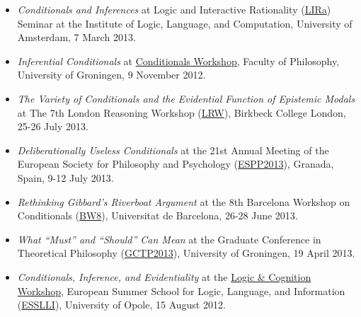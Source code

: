 \documentclass[a4paper,12pt]{article}
\begin{document}
\begin{small}
  \begin{itemize}
  \item \emph{Conditionals and Inferences} at Logic and Interactive
    Rationality (\href{http://www.illc.uva.nl/lgc/seminar/}{LIRa})
    Seminar at the Institute of Logic, Language, and Computation,
    University of Amsterdam, 7 March 2013.
  \item \emph{Inferential Conditionals} at
    \href{https://sites.google.com/site/jannekehuitink/workshop}{Conditionals
      Workshop}, Faculty of Philosophy, University of Groningen, 9
    November 2012.
  \end{itemize}
  
  \begin{itemize}

  \item \emph{The Variety of Conditionals and the Evidential Function
      of Epistemic Modals} at The 7th London Reasoning Workshop (\href{http://www.bbk.ac.uk/psychology/about-us/events/the-7th-london-reasoning-workshop}{LRW}), Birkbeck
    College London, 25-26 July 2013.

  \item \emph{Deliberationally Useless Conditionals} at the 21st
    Annual Meeting of the European Society for Philosophy and
    Psychology (\href{http://espp2013.com}{ESPP2013}), Granada, Spain,
    9-12 July 2013.

  \item \emph{Rethinking Gibbard’s Riverboat Argument} at the 8th
    Barcelona Workshop on Conditionals
    (\href{http://www.ub.edu/logosbw/bw8/index.html}{BW8}),
    Universitat de Barcelona, 26-28 June 2013.
    
  \item \emph{What ``Must'' and ``Should'' Can Mean} at the Graduate
    Conference in Theoretical Philosophy
    (\href{http://www.philos.rug.nl/GCTP2013/}{GCTP2013}), University
    of Groningen, 19 April
    2013. %
    
  \item \emph{Conditionals, Inference, and Evidentiality} at the
    \href{http://www.ai.rug.nl/SocialCognition/logic-cognition/}{Logic
      \& Cognition Workshop}, European Summer School for Logic,
    Language, and Information
    (\href{http://www.esslli2012.pl}{ESSLLI}), University of Opole, 15
    August
    2012. %


\end{itemize}
\end{small}
\end{document}
